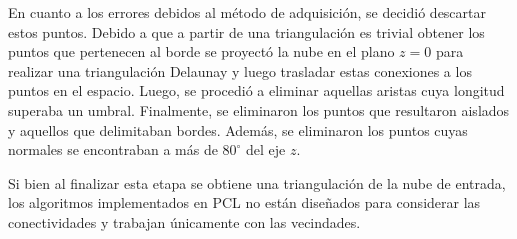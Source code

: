 En cuanto a los errores debidos al método de adquisición, se decidió descartar estos puntos.
Debido a que a partir de una triangulación es trivial obtener los puntos que pertenecen al borde
se proyectó la nube en el plano $z=0$ para realizar una triangulación Delaunay y luego
trasladar estas conexiones a los puntos en el espacio.
Luego, se procedió a eliminar aquellas aristas cuya longitud superaba un umbral.
Finalmente, se eliminaron los puntos que resultaron aislados y aquellos que delimitaban bordes.
Además, se eliminaron los puntos cuyas normales se encontraban a más de $80^{\circ}$ del eje $z$.

Si bien al finalizar esta etapa se obtiene una triangulación de la nube de entrada,
los algoritmos implementados en PCL no están diseñados para considerar las conectividades y trabajan únicamente con las vecindades.
